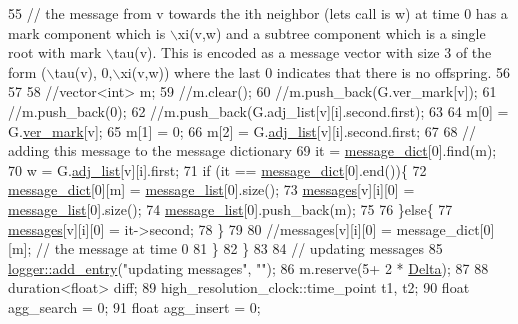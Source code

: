 \begin{DoxyCode}
55       \textcolor{comment}{// the message from v towards the ith neighbor (lets call is w) at time 0 has a mark component which
       is \(\backslash\)xi(v,w) and a subtree component which is a single root with mark \(\backslash\)tau(v). This is encoded as a message
       vector with size 3 of the form (\(\backslash\)tau(v), 0,\(\backslash\)xi(v,w)) where the last 0 indicates that there is no offspring.}
56 
57 
58       \textcolor{comment}{//vector<int> m;}
59       \textcolor{comment}{//m.clear();}
60       \textcolor{comment}{//m.push\_back(G.ver\_mark[v]);}
61       \textcolor{comment}{//m.push\_back(0);}
62       \textcolor{comment}{//m.push\_back(G.adj\_list[v][i].second.first);}
63 
64       m[0] = G.\hyperlink{classmarked__graph_ac83e9377dd4d8bb95be1ac949b127296}{ver\_mark}[v];
65       m[1] = 0;
66       m[2] = G.\hyperlink{classmarked__graph_a1a0bf7ca413a278763f7c878b3b6fd6f}{adj\_list}[v][i].second.first;
67 
68       \textcolor{comment}{// adding this message to the message dictionary}
69       it = \hyperlink{classgraph__message_ab54d89b122c2b1322da0d5db2043fb84}{message\_dict}[0].find(m);
70       w = G.\hyperlink{classmarked__graph_a1a0bf7ca413a278763f7c878b3b6fd6f}{adj\_list}[v][i].first;
71       \textcolor{keywordflow}{if} (it == \hyperlink{classgraph__message_ab54d89b122c2b1322da0d5db2043fb84}{message\_dict}[0].end())\{
72         \hyperlink{classgraph__message_ab54d89b122c2b1322da0d5db2043fb84}{message\_dict}[0][m] = \hyperlink{classgraph__message_aa17fdb629b423343edfafa97252763ef}{message\_list}[0].size();
73         \hyperlink{classgraph__message_aac77e098f0acf9650116a8e51fe3b4b7}{messages}[v][i][0] = \hyperlink{classgraph__message_aa17fdb629b423343edfafa97252763ef}{message\_list}[0].size();
74         \hyperlink{classgraph__message_aa17fdb629b423343edfafa97252763ef}{message\_list}[0].push\_back(m);
75 
76       \}\textcolor{keywordflow}{else}\{
77         \hyperlink{classgraph__message_aac77e098f0acf9650116a8e51fe3b4b7}{messages}[v][i][0] = it->second;
78       \}
79 
80       \textcolor{comment}{//messages[v][i][0] = message\_dict[0][m]; // the message at time 0}
81     \}
82   \}
83 
84   \textcolor{comment}{// updating messages}
85   \hyperlink{classlogger_a710163deb17bc81f70d53d285b8ac9ac}{logger::add\_entry}(\textcolor{stringliteral}{"updating messages"}, \textcolor{stringliteral}{""});
86   m.reserve(5+ 2 * \hyperlink{classgraph__message_a45dfd061b7bc73572e5132fbf66efd55}{Delta});
87 
88   duration<float> diff;
89   high\_resolution\_clock::time\_point t1, t2; 
90   \textcolor{keywordtype}{float} agg\_search = 0;
91   \textcolor{keywordtype}{float} agg\_insert = 0;

\end{DoxyCode}
